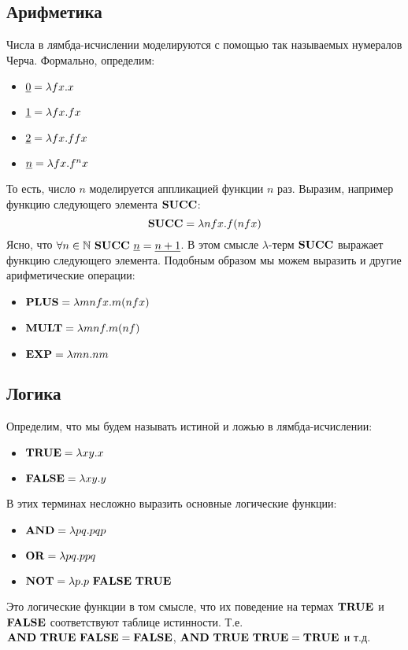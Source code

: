 \subsection{Арифметика}
Числа в лямбда-исчислении моделируются с помощью так называемых нумералов Черча. Формально, определим:
\begin{itemize}
  \item $\underline{0} = \lambda f x . x$
  \item $\underline{1} = \lambda f x . fx$
  \item $\underline{2} = \lambda f x . ffx$
  \item $\underline{n} = \lambda f x . f^nx$
\end{itemize}
То есть, число $n$ моделируется аппликацией функции $n$ раз. Выразим, например функцию следующего элемента $\combinator{succ}$:
$$\combinator{succ} = \lambda nfx . f (n f x)$$
Ясно, что $\forall n \in \mathbb{N}\ \combinator{succ}\ \numeral{n} = \numeral{n + 1}$. В этом смысле $\lambda$-терм
$\combinator{succ}$ выражает функцию следующего элемента. Подобным образом мы можем выразить и другие арифметические операции:
\begin{itemize}
  \item $\combinator{plus} = \lambda m n f x . m (n f x)$
  \item $\combinator{mult} = \lambda m n f . m (n f)$
  \item $\combinator{exp} = \lambda m n . n m$
\end{itemize}

\subsection{Логика}
Определим, что мы будем называть истиной и ложью в лямбда-исчислении:
\begin{itemize}
  \item $\combinator{true} = \lambda x y . x$
  \item $\combinator{false} = \lambda x y . y$
\end{itemize}
В этих терминах несложно выразить основные логические функции:
\begin{itemize}
  \item $\combinator{and} = \lambda p q . p q p$
  \item $\combinator{or} = \lambda p q . p p q$
  \item $\combinator{not} = \lambda p . p\ \combinator{false}\ \combinator{true}$
\end{itemize}
Это логические функции в том смысле, что их поведение на термах $\combinator{true}$ и $\combinator{false}$ соответствуют таблице истинности.
Т.е. $\combinator{and}\ \combinator{true}\ \combinator{false} = \combinator{false}$,
$\combinator{and}\ \combinator{true}\ \combinator{true} = \combinator{true}$ и т.д.

